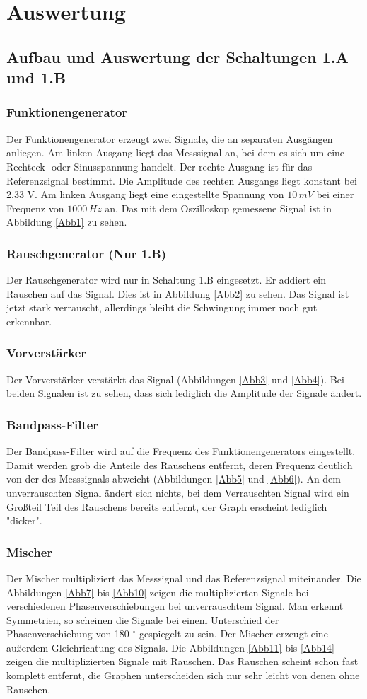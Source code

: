 \documentclass[11pt]{article}
\begin{document}
\section{Auswertung}
\subsection{Aufbau und Auswertung der Schaltungen 1.A und 1.B}
\subsubsection{Funktionengenerator}
Der Funktionengenerator erzeugt zwei Signale, die an separaten Ausgängen anliegen. Am linken Ausgang liegt das Messsignal an, bei dem es sich um eine Rechteck- oder Sinusspannung handelt. Der rechte Ausgang ist für das Referenzsignal bestimmt. Die Amplitude des rechten Ausgangs liegt konstant bei 2.33 V. Am linken Ausgang liegt eine eingestellte Spannung von $10 \, mV$ bei einer Frequenz von $1000 \, Hz$ an. Das mit dem Oszilloskop gemessene Signal ist in Abbildung \ref{Abb1} zu sehen.
\subsubsection{Rauschgenerator (Nur 1.B)}
Der Rauschgenerator wird nur in Schaltung 1.B eingesetzt. Er addiert ein Rauschen auf das Signal. Dies ist in Abbildung \ref{Abb2} zu sehen. Das Signal ist jetzt stark verrauscht, allerdings bleibt die Schwingung immer noch gut erkennbar.
\subsubsection{Vorverstärker}
Der Vorverstärker verstärkt das Signal (Abbildungen \ref{Abb3} und \ref{Abb4}). Bei beiden Signalen ist zu sehen, dass sich lediglich die Amplitude der Signale ändert.
\subsubsection{Bandpass-Filter}
Der Bandpass-Filter wird auf die Frequenz des Funktionengenerators eingestellt. Damit werden grob die Anteile des Rauschens entfernt, deren Frequenz deutlich von der des Messsignals abweicht (Abbildungen \ref{Abb5} und \ref{Abb6}). An dem unverrauschten Signal ändert sich nichts, bei dem Verrauschten Signal wird ein Großteil Teil des Rauschens bereits entfernt, der Graph erscheint lediglich "dicker".
\subsubsection{Mischer}
Der Mischer multipliziert das Messsignal und das Referenzsignal miteinander.  Die Abbildungen \ref{Abb7} bis \ref{Abb10} zeigen die multiplizierten Signale bei verschiedenen Phasenverschiebungen bei unverrauschtem Signal. Man erkennt Symmetrien, so scheinen die Signale bei einem Unterschied der Phasenverschiebung von 180 $^\circ$ gespiegelt zu sein. Der Mischer erzeugt eine außerdem Gleichrichtung des Signals. Die Abbildungen \ref{Abb11} bis \ref{Abb14} zeigen die multiplizierten Signale mit Rauschen. Das Rauschen scheint schon fast komplett entfernt, die Graphen unterscheiden sich nur sehr leicht von denen ohne Rauschen.
\end{document}
